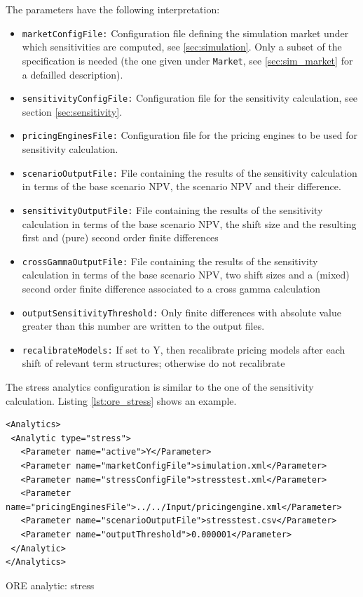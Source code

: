 \documentclass[12pt, a4paper]{article}
\begin{document}
The parameters have the following interpretation:

\begin{itemize}
\item {\tt marketConfigFile:} Configuration file defining the simulation market under which sensitivities are computed,
  see \ref{sec:simulation}. Only a subset of the specification is needed (the one given under {\tt Market}, see
  \ref{sec:sim_market} for a defailled description).
\item {\tt sensitivityConfigFile:} Configuration file  for the sensitivity calculation, see section \ref{sec:sensitivity}.
\item {\tt pricingEnginesFile:} Configuration file for the pricing engines to be used for sensitivity calculation.
\item {\tt scenarioOutputFile:} File containing the results of the sensitivity calculation in terms of the base scenario
  NPV, the scenario NPV and their difference.
\item {\tt sensitivityOutputFile:} File containing the results of the sensitivity calculation in terms of the base scenario
  NPV, the shift size and the resulting first and (pure) second order finite differences
\item {\tt crossGammaOutputFile:} File containing the results of the sensitivity calculation in terms of the base scenario
  NPV, two shift sizes and a (mixed) second order finite difference associated to a cross gamma calculation
\item {\tt outputSensitivityThreshold:} Only finite differences with absolute value greater than this number are written
  to the output files.
\item {\tt recalibrateModels:} If set to Y, then recalibrate pricing models after each shift of relevant term structures; otherwise do not recalibrate
\end{itemize}

The stress analytics configuration is similar to the one of the sensitivity calculation. Listing \ref{lst:ore_stress}
shows an example.

\begin{listing}[H]
\begin{verbatim}
<Analytics>
 <Analytic type="stress">
   <Parameter name="active">Y</Parameter>
   <Parameter name="marketConfigFile">simulation.xml</Parameter>
   <Parameter name="stressConfigFile">stresstest.xml</Parameter>
   <Parameter name="pricingEnginesFile">../../Input/pricingengine.xml</Parameter>
   <Parameter name="scenarioOutputFile">stresstest.csv</Parameter>
   <Parameter name="outputThreshold">0.000001</Parameter>
 </Analytic>
</Analytics>
\end{verbatim}
\caption{ORE analytic: stress}
\label{lst:ore_stress}
\end{listing}
\end{document}

